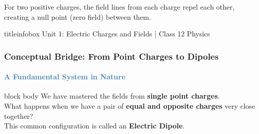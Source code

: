 \begin{frame}
\begin{frame}
\begin{columns}[T]
    \begin{center}
    \end{center}
\end{columns}

\vspace{0.3cm}

\begin{importantbox}
\vspace{0.1cm}
For two positive charges, the field lines from each charge repel each other, creating a null point (zero field) between them.
\vspace{0.1cm}
\end{importantbox}

\vfill

\begin{beamercolorbox}[wd=\textwidth,ht=0.5cm,dp=0.1cm,center]{titleinfobox}
    \small\color{coolgray} Unit 1: Electric Charges and Fields | Class 12 Physics
\end{beamercolorbox}
\end{frame}

\begin{frame}
\frametitle{\textsf{\textbf{Conceptual Bridge:} From Point Charges to Dipoles}}
\framesubtitle{\textcolor{steelblue}{A Fundamental System in Nature}}

\vspace{0.5cm}

\begin{center}
\begin{beamercolorbox}[wd=0.95\textwidth,rounded=true,shadow=true]{block body}
\vspace{0.3cm}
\large
{}\quad We have mastered the fields from \textbf{single point charges}.
\\[0.5cm]
\quad What happens when we have a pair of \textbf{equal and opposite charges} very close together?
\\[0.5cm]
\quad This common configuration is called an \textbf{Electric Dipole}.
\vspace{0.3cm}
\end{beamercolorbox}
\end{center}


\end{frame}
\end{frame}
